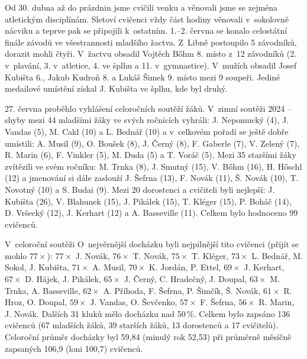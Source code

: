 \documentclass[11pt]{article}
\begin{document}
\clearpage
\nopagecolor
\normalcolor

\restoregeometry
\pagestyle{standard}



Od 30. dubna až do prázdnin jsme cvičili venku a věnovali jsme se zejména atletickým disciplínám. Sletoví cvičenci vždy část hodiny věnovali v~sokolovně nácviku a teprve pak se připojili k~ostatním. 1.–2. června se konalo celostátní finále závodů ve všestrannosti mladšího žactva. Z~Libně postoupilo 5 závodníků, dorazit mohli čtyři. V~žactvu obsadil Vojtěch Bőhm 8. místo z~12 závodníků (2. v~plavání, 3. v~atletice, 4. ve šplhu a 11. v~gymnastice). V~mužích obsadil Josef Kubišta 6., Jakub Kudroň 8. a Lukáš Šimek 9. místo mezi 9 soupeři. Jediné medailové umístění získal J. Kubišta ve šplhu, kde byl druhý. 

27. června proběhlo vyhlášení celoročních soutěží žáků. V~zimní soutěži 2024 – shyby mezi 44 mladšími žáky ve svých ročnících vyhráli: J. Nepomucký (4), J. Vandas (5), M. Cakl (10) a L. Bednář (10) a v~celkovém pořadí se ještě dobře umístili:  A. Musil (9), O. Boušek (8), J. Černý (8), F. Gaberle (7), V. Zelený (7), R. Marin (6), F. Vinkler (5), M. Duda (5) a T. Voráč (5). Mezi 35 staršími žáky zvítězili ve svém ročníku: M. Trnka (8), J. Smutný (15), V. Bőhm (16), H. Hőschl (12) a  jmenování si dále zaslouží J. Šefrna (13), F. Novák (11), Š. Novák (10), T. Novotný (10) a S. Budai (9). Mezi 20 dorostenci a cvičiteli byli nejlepší:  J. Kubišta (26), V. Blahunek (15), J. Pikálek (15), T. Kléger (15), P. Boháč (14), D. Vršecký (12), J. Kerhart (12) a A. Basseville (11). Celkem bylo hodnoceno 99 cvičenců. 

V~celoroční soutěži O~nejvěrnější docházku byli nejpilnější tito cvičenci (přijít se mohlo $77\times$): $77\times$ J. Novák, $76\times$ T. Novák, $75\times$ T. Kléger, $73\times$ L. Bednář, M. Sokol, J. Kubišta, $71\times$ A. Musil, $70\times$ K. Jordán, P. Ettel, $69\times$ J. Kerhart, $67\times$ D. Hájek, J. Pikálek, $65\times$ J. Černý, C. Hradečný, J. Doupal, $63\times$ M. Trnka, A. Basseville, $62\times$ A. Příhoda, F. Šefrna, P. Šimčík, Š. Novák, $61\times$ R. Hroz, O. Doupal, $59\times$ J. Vandas, O. Ševčenko, $57\times$ F. Šefrna, $56\times$ R. Marin, J. Novák. Dalších 31 kluků mělo docházku nad 50\,\%. Celkem bylo zapsáno 136 cvičenců (67 mladších žáků, 39 starších žáků, 13 dorostenců a 17 cvičitelů). Celoroční průměr docházky byl 59,84 (minulý rok 52,53) při průměrně měsíčně zapsaných 106,9 (loni 100,7) cvičenců. 
\end{document}
